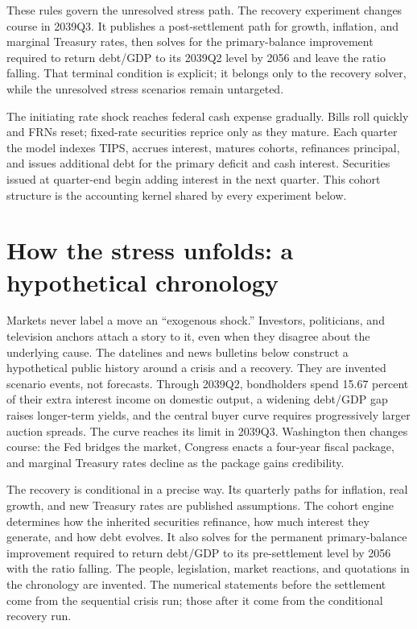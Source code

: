 \documentclass[11pt]{article}
\begin{document}
These rules govern the unresolved stress path.  The recovery experiment changes course in
2039Q3.  It publishes a post-settlement path for growth, inflation, and marginal Treasury
rates, then solves for the primary-balance improvement required to return debt/GDP to its
2039Q2 level by 2056 and leave the ratio falling.  That terminal condition is explicit; it
belongs only to the recovery solver, while the unresolved stress scenarios remain untargeted.

The initiating rate shock reaches federal cash expense gradually.  Bills roll quickly and
FRNs reset; fixed-rate securities reprice only as they mature.  Each quarter the model
indexes TIPS, accrues interest, matures cohorts, refinances principal, and issues additional
debt for the primary deficit and cash interest.  Securities issued at quarter-end begin
adding interest in the next quarter.  This cohort structure is the accounting kernel shared
by every experiment below.

\section{How the stress unfolds: a hypothetical chronology}

Markets never label a move an ``exogenous shock.''  Investors, politicians, and television
anchors attach a story to it, even when they disagree about the underlying cause.  The
datelines and news bulletins below construct a hypothetical public history around a
crisis and a recovery. They are invented scenario events, not forecasts.  Through 2039Q2, bondholders spend 15.67 percent of their extra interest income on
domestic output, a widening debt/GDP gap raises longer-term yields, and the central buyer
curve requires progressively larger auction spreads.  The curve reaches its limit in
2039Q3.  Washington then changes course: the Fed bridges the market, Congress enacts a
four-year fiscal package, and marginal Treasury rates decline as the package gains
credibility.

The recovery is conditional in a precise way.  Its quarterly paths for inflation, real
growth, and new Treasury rates are published assumptions.  The cohort engine determines how
the inherited securities refinance, how much interest they generate, and how debt evolves.
It also solves for the permanent primary-balance improvement required to return debt/GDP to
its pre-settlement level by 2056 with the ratio falling.  The people, legislation, market
reactions, and quotations in the chronology are invented.  The numerical statements before
the settlement come from the sequential crisis run; those after it come from the conditional
recovery run.
\end{document}
